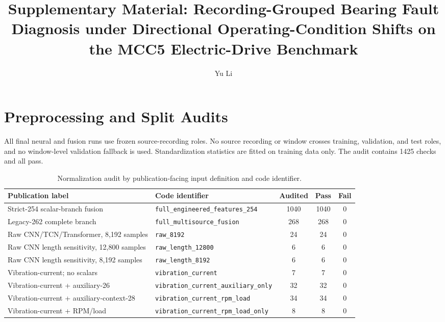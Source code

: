 \documentclass[11pt]{article}
\begin{document}
\renewcommand{\thetable}{S\arabic{table}}
\renewcommand{\thefigure}{S\arabic{figure}}
\title{Supplementary Material: Recording-Grouped Bearing Fault Diagnosis under Directional Operating-Condition Shifts on the MCC5 Electric-Drive Benchmark}
\author{Yu Li}
\date{}
\maketitle

\section{Preprocessing and Split Audits}
All final neural and fusion runs use frozen source-recording roles. No source recording or window crosses training, validation, and test roles, and no window-level validation fallback is used. Standardization statistics are fitted on training data only. The audit contains 1425 checks and all pass.


\begin{table}[H]
\centering
\caption{Normalization audit by publication-facing input definition and code identifier.}
\label{tab:s_norm}
\small
\setlength{\tabcolsep}{3pt}
\begin{tabularx}{\textwidth}{>{\raggedright\arraybackslash}p{} >{\raggedright\arraybackslash}X c c c}
\toprule
Publication label & Code identifier & Audited & Pass & Fail \\
\midrule
Strict-254 scalar-branch fusion & \nolinkurl{full_engineered_features_254} & 1040 & 1040 & 0 \\
Legacy-262 complete branch & \nolinkurl{full_multisource_fusion} & 268 & 268 & 0 \\
Raw CNN/TCN/Transformer, 8,192 samples & \nolinkurl{raw_8192} & 24 & 24 & 0 \\
Raw CNN length sensitivity, 12,800 samples & \nolinkurl{raw_length_12800} & 6 & 6 & 0 \\
Raw CNN length sensitivity, 8,192 samples & \nolinkurl{raw_length_8192} & 6 & 6 & 0 \\
Vibration-current; no scalars & \nolinkurl{vibration_current} & 7 & 7 & 0 \\
Vibration-current + auxiliary-26 & \nolinkurl{vibration_current_auxiliary_only} & 32 & 32 & 0 \\
Vibration-current + auxiliary-context-28 & \nolinkurl{vibration_current_rpm_load} & 34 & 34 & 0 \\
Vibration-current + RPM/load & \nolinkurl{vibration_current_rpm_load_only} & 8 & 8 & 0 \\
\bottomrule
\end{tabularx}
\end{table}
\end{document}
